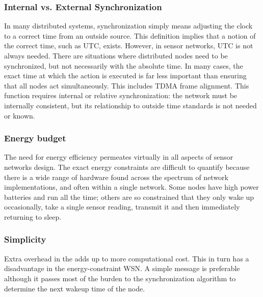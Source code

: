 \documentclass[a4paper,10pt]{report}
\begin{document}
\subsubsection{\textbf{Internal vs. External Synchronization}}
In many distributed systems, synchronization simply means adjusting the clock to a correct time from an outside source. This
definition implies that a notion of the correct time, such as UTC, exists. However, in sensor networks, UTC is not always needed. There are situations where distributed nodes need to be synchronized, but not necessarily with the absolute time.
In many cases, the exact time at which the action is executed is far less important than ensuring that all nodes act simultaneously. This includes TDMA frame alignment. This function requires internal or relative synchronization: the network must be internally consistent, but its relationship to outside time standards is not needed or known.
\subsubsection{\textbf{Energy budget}} The need for energy efficiency permeates virtually in all aspects of sensor networks design. The exact energy constraints are difficult to quantify because there is a wide range of hardware found across the spectrum of network
implementations, and often within a single network. Some nodes have high power batteries and run all the time; others are so constrained that they only wake up occasionally, take a single sensor reading, transmit it and then immediately returning to sleep.
\subsubsection{\textbf{Simplicity}} Extra overhead in the adds up to more computational cost. This in turn has a disadvantage in the energy-constraint WSN. A simple message is preferable although it passes most of the burden to the synchronization algorithm to determine the next wakeup time of the node.
\end{document}
